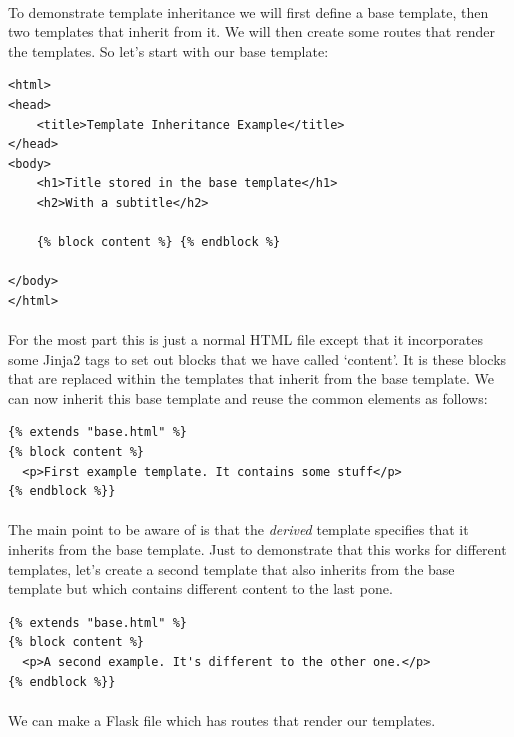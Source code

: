 \documentclass[12pt, a4paper, oneside]{book}
\begin{document}
{\paragraph{} To demonstrate template inheritance we will first define a base template, then two templates that inherit from it. We will then create some routes that render the templates. So let's start with our base template:

\begin{lstlisting}
<html>
<head>
    <title>Template Inheritance Example</title>
</head>
<body>
    <h1>Title stored in the base template</h1>
    <h2>With a subtitle</h2>

    {% block content %} {% endblock %}

</body>
</html>
\end{lstlisting}

\paragraph{} For the most part this is just a normal HTML file except that it incorporates some Jinja2 tags to set out blocks that we have called `content'. It is these blocks that are replaced within the templates that inherit from the base template. We can now inherit this base template and reuse the common elements as follows:

\begin{lstlisting}
{% extends "base.html" %}
{% block content %}
  <p>First example template. It contains some stuff</p>
{% endblock %}}
\end{lstlisting}

\paragraph{} The main point to be aware of is that the \emph{derived} template specifies that it inherits from the base template. Just to demonstrate that this works for different templates, let's create a second template that also inherits from the base template but which contains different content to the last pone.

\begin{lstlisting}
{% extends "base.html" %}
{% block content %}
  <p>A second example. It's different to the other one.</p>
{% endblock %}}
\end{lstlisting}

\paragraph{} We can make a Flask file which has routes that render our templates.

}
\end{document}
